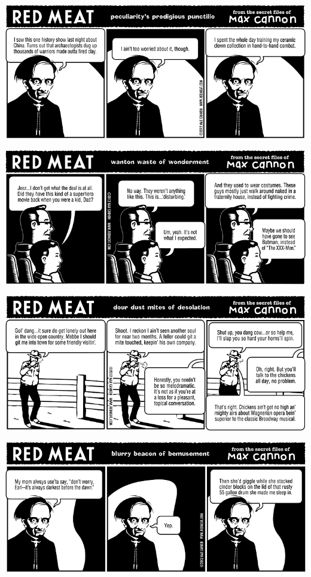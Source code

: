 \documentclass[a4paper,twoside,11pt]{article}
\begin{document}
\includegraphics[width=\textwidth]{redmeat_2012-10-16.png}



\includegraphics[width=\textwidth]{redmeat_2012-10-23.png}



\includegraphics[width=\textwidth]{redmeat_2012-10-30.png}



\includegraphics[width=\textwidth]{redmeat_2012-11-06.png}
\end{document}
